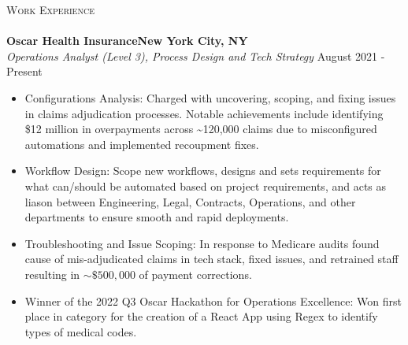 \documentclass[a4paper]{article}
\newcommand{\lineunder} {
    \vspace*{-8pt} \\
    \hspace*{-18pt} \hrulefill \\
}
\newcommand{\header} [1] {
    {\hspace*{-18pt}\vspace*{6pt} \textsc{#1}}
    \vspace*{-6pt} \lineunder
}
\begin{document}
\header{Work Experience}
\vspace{1mm}
\textbf{Oscar Health Insurance\hfill New York City, NY}\\
\textit{Operations Analyst (Level 3), Process Design and Tech Strategy} \hfill August 2021 - Present\\
\vspace{-1mm}
\begin{itemize} \itemsep 1pt
    \item Configurations Analysis: Charged with uncovering, scoping, and fixing issues in claims adjudication processes. 
        Notable achievements include identifying \$12 million in overpayments across \textasciitilde{}120,000 claims due to misconfigured automations and implemented recoupment fixes.

    \item   Workflow Design: Scope new workflows, designs and sets requirements for what can/should be automated based on project requirements,
     and acts as liason between Engineering, Legal, Contracts, Operations, and other departments to ensure smooth and rapid deployments.
     \item 	Troubleshooting and Issue Scoping: In response to Medicare audits found cause of mis-adjudicated claims in tech stack, fixed issues, and retrained staff
     resulting in $\sim\$500,000$ of payment corrections.

     \item Winner of the 2022 Q3 Oscar Hackathon for Operations Excellence: Won first place in category for the creation of a React App using Regex to identify types of medical codes.
\end{itemize}
\end{document}
